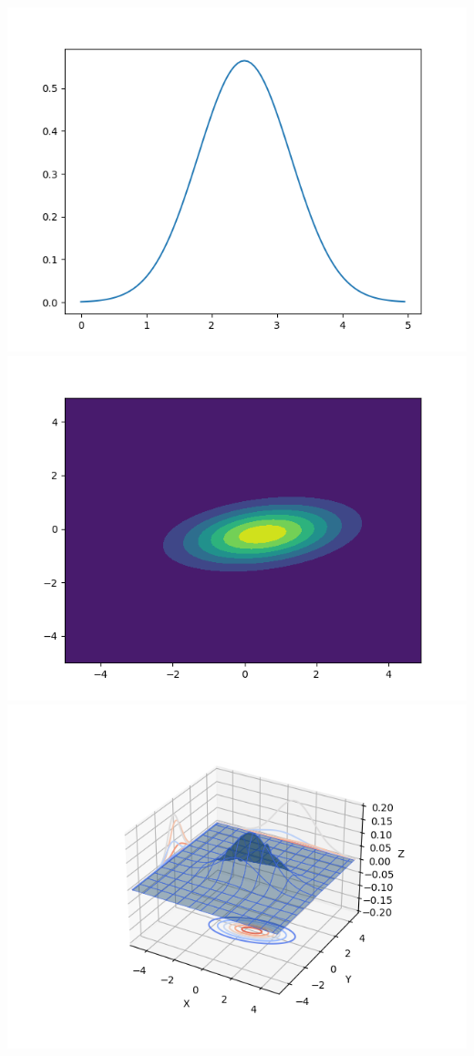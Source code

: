 \documentclass[
  letterpaper,
  DIV=11,
  numbers=noendperiod]{scrreprt}
\theoremstyle{definition}
\theoremstyle{plain}
\theoremstyle{remark}
\begin{document}
\includegraphics{Figure_4.png} \includegraphics{Figure_5.png}
\includegraphics{Figure_6.png}
\end{document}
